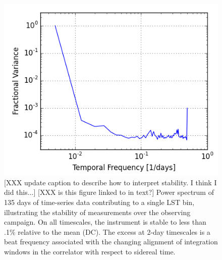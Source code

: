 \documentclass[twocolumn,numberedappendix]{emulateapj} \shorttitle{New Limits on the 21 cm Power Spectrum at $z=8.4$}
\begin{document}
\begin{figure}
\centering
\includegraphics[width=\columnwidth]{plots/stability.png}
\caption{
[XXX update caption to describe how to interpret stability. I think I did this...]
[XXX is this figure linked to in text?]
Power spectrum of 135 days of time-series data contributing to a single LST
bin, illustrating the stability of measurements over the observing campaign.
On all timescales, the instrument is stable to less than .1\% relative to the
mean (DC). The excess at 2-day timescales is a beat frequency associated with
the changing alignment of integration windows in the correlator with respect to
sidereal time.  
}\label{fig:stability}
\end{figure}
\end{document}
